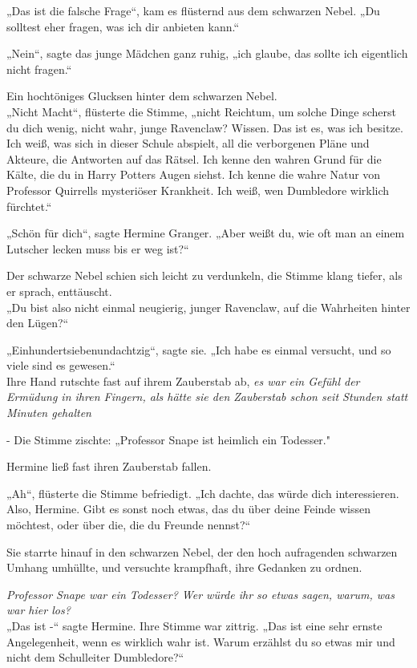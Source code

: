 {„Das ist die falsche Frage“, kam es flüsternd aus dem schwarzen Nebel. „Du solltest eher fragen, was ich dir anbieten kann.“

„Nein“, sagte das junge Mädchen ganz ruhig, „ich glaube, das sollte ich eigentlich nicht fragen.“

Ein hochtöniges Glucksen hinter dem schwarzen Nebel.\\ „Nicht Macht“, flüsterte die Stimme, „nicht Reichtum, um solche Dinge scherst du dich wenig, nicht wahr, junge Ravenclaw? Wissen. Das ist es, was ich besitze. Ich weiß, was sich in dieser Schule abspielt, all die verborgenen Pläne und Akteure, die Antworten auf das Rätsel. Ich kenne den wahren Grund für die Kälte, die du in Harry Potters Augen siehst. Ich kenne die wahre Natur von Professor Quirrells mysteriöser Krankheit. Ich weiß, wen Dumbledore wirklich fürchtet.“

„Schön für dich“, sagte Hermine Granger. „Aber weißt du, wie oft man an einem Lutscher lecken muss bis er weg ist?“

Der schwarze Nebel schien sich leicht zu verdunkeln, die Stimme klang tiefer, als er sprach, enttäuscht.\\ „Du bist also nicht einmal neugierig, junger Ravenclaw, auf die Wahrheiten hinter den Lügen?“

„Einhundertsiebenundachtzig“, sagte sie. „Ich habe es einmal versucht, und so viele sind es gewesen.“\\ Ihre Hand rutschte fast auf ihrem Zauberstab ab, \emph{es war ein Gefühl der Ermüdung in ihren Fingern, als hätte sie den Zauberstab schon seit Stunden statt Minuten gehalten}

- Die Stimme zischte: „Professor Snape ist heimlich ein Todesser."

Hermine ließ fast ihren Zauberstab fallen.

„Ah“, flüsterte die Stimme befriedigt. „Ich dachte, das würde dich interessieren. Also, Hermine. Gibt es sonst noch etwas, das du über deine Feinde wissen möchtest, oder über die, die du Freunde nennst?“

Sie starrte hinauf in den schwarzen Nebel, der den hoch aufragenden schwarzen Umhang umhüllte, und versuchte krampfhaft, ihre Gedanken zu ordnen.

\emph{Professor Snape war ein Todesser? Wer würde ihr so etwas sagen, warum, was war hier los?}\\ „Das ist -“ sagte Hermine. Ihre Stimme war zittrig. „Das ist eine sehr ernste Angelegenheit, wenn es wirklich wahr ist. Warum erzählst du so etwas mir und nicht dem Schulleiter Dumbledore?“

}
